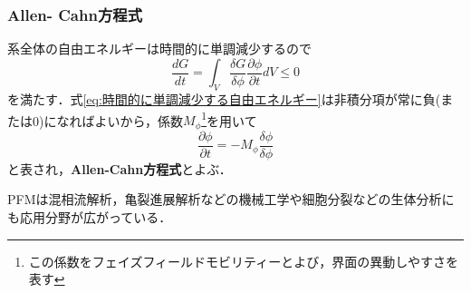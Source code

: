 \documentclass[dvipdfmx]{jsreport}
\begin{document}
\subsubsection*{Allen- Cahn方程式}
	系全体の自由エネルギーは時間的に単調減少するので
\begin{equation} \label{eq:時間的に単調減少する自由エネルギー}
	\frac{dG}{dt}= \int_V \frac{\delta G}{\delta\phi}\frac{\partial \phi}{\partial t}dV\le 0
\end{equation}
	を満たす．式\eqref{eq:時間的に単調減少する自由エネルギー}は非積分項が常に負(または0)になればよいから，係数$M_\phi$\footnote{この係数をフェイズフィールドモビリティーとよび，界面の異動しやすさを表す}を用いて
\begin{equation}
	\frac{\partial \phi}{\partial t}= -M_\phi\frac{\delta \phi}{\delta \phi}
\end{equation}
	と表され，\textbf{Allen-Cahn方程式}とよぶ．

	PFMは混相流解析，亀裂進展解析などの機械工学や細胞分裂などの生体分析にも応用分野が広がっている．
\end{document}

